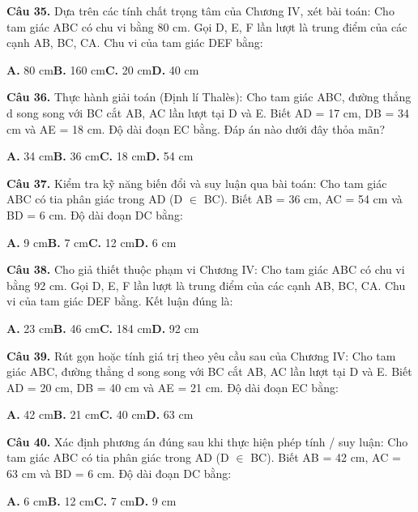 \documentclass[11pt,a4paper]{article}
\begin{document}
\textbf{\color{primary} Câu 35.} Dựa trên các tính chất trọng tâm của Chương IV, xét bài toán: Cho tam giác ABC có chu vi bằng 80 cm. Gọi D, E, F lần lượt là trung điểm của các cạnh AB, BC, CA. Chu vi của tam giác DEF bằng:\par
\hspace*{1.5em}\textbf{A.} 80 cm\quad\quad \textbf{B.} 160 cm\quad\quad \textbf{C.} 20 cm\quad\quad \textbf{D.} 40 cm\par\vspace{2pt}
\textbf{\color{primary} Câu 36.} Thực hành giải toán (Định lí Thalès): Cho tam giác ABC, đường thẳng d song song với BC cắt AB, AC lần lượt tại D và E. Biết AD = 17 cm, DB = 34 cm và AE = 18 cm. Độ dài đoạn EC bằng. Đáp án nào dưới đây thỏa mãn?\par
\hspace*{1.5em}\textbf{A.} 34 cm\quad\quad \textbf{B.} 36 cm\quad\quad \textbf{C.} 18 cm\quad\quad \textbf{D.} 54 cm\par\vspace{2pt}
\textbf{\color{primary} Câu 37.} Kiểm tra kỹ năng biến đổi và suy luận qua bài toán: Cho tam giác ABC có tia phân giác trong AD (D $\in$ BC). Biết AB = 36 cm, AC = 54 cm và BD = 6 cm. Độ dài đoạn DC bằng:\par
\hspace*{1.5em}\textbf{A.} 9 cm\quad\quad \textbf{B.} 7 cm\quad\quad \textbf{C.} 12 cm\quad\quad \textbf{D.} 6 cm\par\vspace{2pt}
\textbf{\color{primary} Câu 38.} Cho giả thiết thuộc phạm vi Chương IV: Cho tam giác ABC có chu vi bằng 92 cm. Gọi D, E, F lần lượt là trung điểm của các cạnh AB, BC, CA. Chu vi của tam giác DEF bằng. Kết luận đúng là:\par
\hspace*{1.5em}\textbf{A.} 23 cm\quad\quad \textbf{B.} 46 cm\quad\quad \textbf{C.} 184 cm\quad\quad \textbf{D.} 92 cm\par\vspace{2pt}
\textbf{\color{primary} Câu 39.} Rút gọn hoặc tính giá trị theo yêu cầu sau của Chương IV: Cho tam giác ABC, đường thẳng d song song với BC cắt AB, AC lần lượt tại D và E. Biết AD = 20 cm, DB = 40 cm và AE = 21 cm. Độ dài đoạn EC bằng:\par
\hspace*{1.5em}\textbf{A.} 42 cm\quad\quad \textbf{B.} 21 cm\quad\quad \textbf{C.} 40 cm\quad\quad \textbf{D.} 63 cm\par\vspace{2pt}
\textbf{\color{primary} Câu 40.} Xác định phương án đúng sau khi thực hiện phép tính / suy luận: Cho tam giác ABC có tia phân giác trong AD (D $\in$ BC). Biết AB = 42 cm, AC = 63 cm và BD = 6 cm. Độ dài đoạn DC bằng:\par
\hspace*{1.5em}\textbf{A.} 6 cm\quad\quad \textbf{B.} 12 cm\quad\quad \textbf{C.} 7 cm\quad\quad \textbf{D.} 9 cm\par\vspace{2pt}
\end{document}
